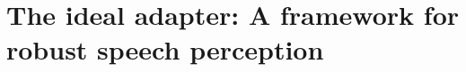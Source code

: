 


\chapter[The ideal adapter: A framework for robust speech perception]{The ideal adapter: A framework for robust speech perception\protect\footnotemark{}}\label{chap:ideal-adapter}


